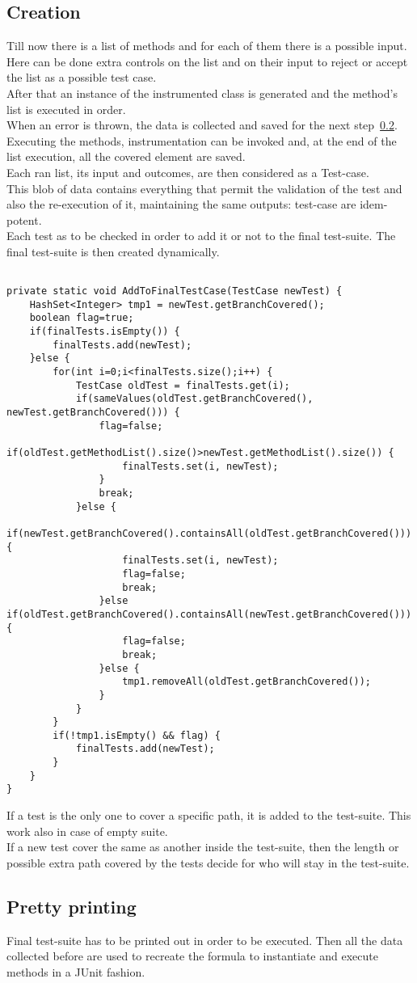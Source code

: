 \subsection{Creation}\label{subsec:creation}
Till now there is a list of methods and for each of them there is a possible input.
Here can be done extra controls on the list and on their input to reject or accept the list as a possible test case.\\
After that an instance of the instrumented class is generated and the method's list is executed in order.\\
When an error is thrown, the data is collected and saved for the next step~\ref{subsec:prettyprinting}.
Executing the methods, instrumentation can be invoked and, at the end of the list execution, all the covered element are saved.\\
Each ran list, its input and outcomes, are then considered as a Test-case.\\
This blob of data contains everything that permit the validation of the test and also the re-execution of it, maintaining the same outputs: test-case are idem-potent.\\
Each test as to be checked in order to add it or not to the final test-suite.
The final test-suite is then created dynamically.
\begin{lstlisting}[caption={Check test method},label={lst:checkForFinalTestSuite}]% Start your code-block

private static void AddToFinalTestCase(TestCase newTest) {
	HashSet<Integer> tmp1 = newTest.getBranchCovered();
	boolean flag=true;
	if(finalTests.isEmpty()) {
		finalTests.add(newTest);
	}else {
		for(int i=0;i<finalTests.size();i++) {
			TestCase oldTest = finalTests.get(i);
			if(sameValues(oldTest.getBranchCovered(), newTest.getBranchCovered())) {
				flag=false;
				if(oldTest.getMethodList().size()>newTest.getMethodList().size()) {
					finalTests.set(i, newTest);
				}
				break;
			}else {
				if(newTest.getBranchCovered().containsAll(oldTest.getBranchCovered())) {
					finalTests.set(i, newTest);
					flag=false;
					break;
				}else if(oldTest.getBranchCovered().containsAll(newTest.getBranchCovered())){
					flag=false;
					break;
				}else {
					tmp1.removeAll(oldTest.getBranchCovered());
				}
			}
		}
		if(!tmp1.isEmpty() && flag) {
			finalTests.add(newTest);
		}
	}
}
\end{lstlisting}
If a test is the only one to cover a specific path, it is added to  the test-suite.
This work also in case of empty suite.\\
If a new test cover the same as another inside the test-suite, then the length or possible extra path covered by the tests decide for who will stay in the test-suite.
\subsection{Pretty printing}\label{subsec:prettyprinting}
Final test-suite has to be printed out in order to be executed.
Then all the data collected before are used to recreate the formula to instantiate and execute methods in a JUnit fashion.
